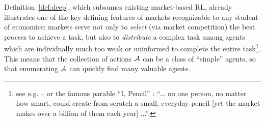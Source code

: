 




Definition~\ref{def:deep}, which subsumes existing market-based RL, already illustrates one of the key defining features of markets recognizable to any student of economics: markets serve not only to \emph{select} (via market competition) the best process to achieve a task, but also to \emph{distribute} a complex task among agents which are individually much too weak or uninformed to complete the entire task\footnote{see e.g. \cite{hayekEconomicsKnowledge1937} -- or the famous parable ``I, Pencil'' \cite{leonardereadPencilMyFamily1958}: ``... no one person, no matter how smart, could create from scratch a small, everyday pencil [yet the market makes over a billion of them each year] ...''.}. This means that the collection of actions $\mathcal{A}$ can be a class of ``simple'' agents, so that enumerating $\mathcal{A}$ can quickly find many valuable agents.


